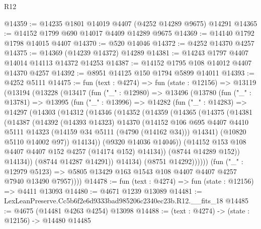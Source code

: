\begin{lexlean}{R12}
\begin{coremodule}
@14359 := @14235 @1801 @14019 @4407 (@4252 @14289 @9675) @14291
@14365 := @14152 @1799 @690 @14017 @4409 @14289 @9675
@14369 := @14140 @1792 @1798 @14015 @4407
@14370 := @520 @14046
@14372 := @4252 @14370 @4257
@14375 := @14369 (@14239 @14372) @14289
@14381 := @14243 @1797 @4407 @14014 @14113 @14372 @14253
@14387 := @14152 @1795 @108 @14012 @4407 @14370 @4257
@14392 := @8951 @14125 @150 @1794 @5899 @14011
@14393 := @4252 @5111
@14475 := fun (text : @4274) =>
  fun (state : @12156) =>
  @13119
    (@13194
      (@13228
        (@13417
          (fun ("_" : @12980) =>
          @13496
            (@13780
              (fun ("_" : @13781) =>
              @13995
                (fun ("_" : @13996) =>
                @14282
                  (fun ("_" : @14283) =>
                  @14297
                    (@14303
                      (@14312
                        (@14346
                          (@14352
                            (@14359
                              (@14365
                                (@14375
                                  (@14381
                                    (@14387
                                      (@14392
                                        (@14393 @14323)
                                        @14370
                                        (@14152
                                          @106
                                          @695
                                          @4407
                                          @4410
                                          @5111
                                          @14323
                                          (@14159 @34 @5111 (@4790 (@14162 @34)))
                                          @14341)
                                        (@10820 @5110 @14002 @97))
                                      @14134))
                                  (@9320 @14036 @14046))
                                (@14152 @153 @108 @4407 @4407 @152 @4257 (@14174 @152) @14134))
                              (@8744 @14289 @152))
                            @14134))
                        (@8744 @14287 @14291))
                      @14134)
                    (@8751 @14292))))))
          (fun ("_" : @12979 @5123) =>
          @5805 @13429 @163 @1543 @108 @4407 @4407 @4257 @7940 @13490 @7957))))
@14478 := fun (text : @4274) => fun (state : @12156) => @4411 @13093
@14480 := @4671 @1239 @13089
@14481 := LexLeanPreserve.Cc5b6f2e6d9333bad985206c2340ec23b.R12.__fits_18
@14485 := @4675 (@14481 @4263 @4254) @13098
@14488 := (text : @4274) -> (state : @12156) -> @14480 @14485

\end{coremodule}
\end{lexlean}
